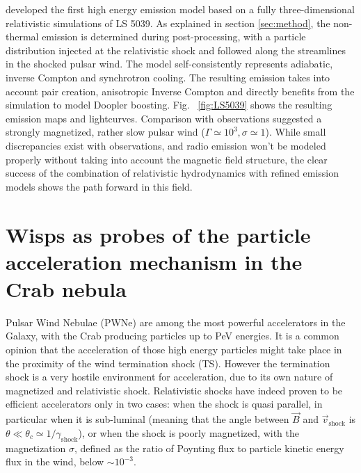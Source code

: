 
\citet{2015A&A...581A..27D} developed the first high energy emission model based on a fully three-dimensional relativistic simulations of LS 5039.  As explained in section \ref{sec:method}, the non-thermal emission is determined during post-processing, with a particle distribution injected at the relativistic shock and followed along the streamlines in the shocked pulsar wind. The model self-consistently represents adiabatic, inverse Compton and synchrotron cooling. The resulting emission takes into account pair creation, anisotropic Inverse Compton and directly benefits from the simulation to model Doopler boosting.  Fig. ~\ref{fig:LS5039} shows the resulting emission maps and lightcurves.  Comparison with observations suggested a strongly magnetized, rather slow pulsar wind ($\Gamma\simeq 10^3, \sigma \simeq 1$). While small discrepancies exist with observations, and radio emission won't be modeled properly without taking into account the magnetic field structure, the clear success of the combination of relativistic hydrodynamics with refined emission models shows the path forward in this field.



\section{Wisps as probes of the particle acceleration mechanism in the Crab nebula}
Pulsar Wind Nebulae (PWNe) are among the most powerful accelerators in the Galaxy, with the Crab producing particles up to PeV energies. 
It is a common opinion that the acceleration of those high energy particles might take place in the proximity of the wind termination shock (TS). However the termination shock is a very hostile environment for acceleration, due to its own nature of magnetized and relativistic shock. 
Relativistic shocks have indeed proven to be efficient accelerators only in two cases: when the shock is quasi parallel, in particular when it is sub-luminal (meaning that the angle between $\vec{B}$ and $\vec{v}_\mathrm{shock}$ is $\theta\ll\theta_c\simeq 1/\gamma_\mathrm{shock}$), or when the shock is poorly magnetized, with the magnetization $\sigma$, defined as the ratio of Poynting flux to particle kinetic energy flux in the wind, below $\sim 10^{-3}$.

